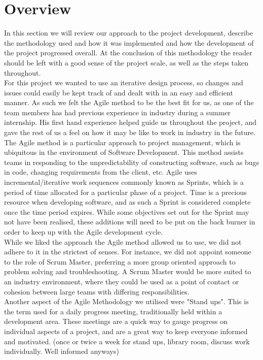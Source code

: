 \section{Overview}
In this section we will review our approach to the project development, describe the methodology used and how it was implemented and how the development of the project progressed overall. At the conclusion of this methodology the reader should be left with a good sense of the project scale, as well as the steps taken throughout.
\\
For this project we wanted to use an iterative design process, so changes and issues could easily be kept track of and dealt with in an easy and efficient manner. As such we felt the Agile method to be the best fit for us, as one of the team members has had previous experience in industry during a summer internship. His first hand experience helped guide us throughout the project, and gave the rest of us a feel on how it may be like to work in industry in the future.
\\
The Agile method is a particular approach to project management, which is ubiquitous in the environment of Software Development. This method assists teams in responding to the unpredictability of constructing software, such as bugs in code, changing requirements from the client, etc. Agile uses incremental/iterative work sequences commonly known as Sprints, which is a period of time allocated for a particular phase of a project. Time is a precious resource when developing software, and as such a Sprint is considered complete once the time period expires. While some objectives set out for the Sprint may not have been realised, these additions will need to be put on the back burner in order to keep up with the Agile development cycle.
\\
While we liked the approach the Agile method allowed us to use, we did not adhere to it in the strictest of senses. For instance, we did not appoint someone to the role of Scrum Master, preferring a more group oriented approach to problem solving and troubleshooting. A Scrum Master would be more suited to an industry environment, where they could be used as a point of contact or cohesion between large teams with differing responsibilities.
\\
Another aspect of the Agile Methodology we utilised were "Stand ups". This is the term used for a daily progress meeting, traditionally held within a development area. These meetings are a quick way to gauge progress on individual aspects of a project, and are a great way to keep everyone informed and motivated. (once or twice a week for stand ups, library room, discuss work individually. Well informed anyways)

